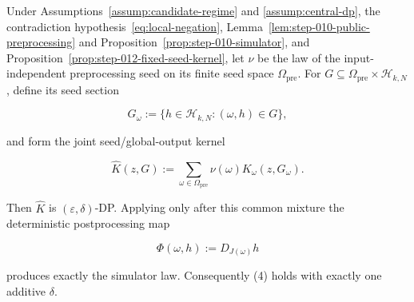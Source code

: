 \begin{lemma}\label{lem:step-012-postprocess-mixture}
Under Assumptions~\ref{assump:candidate-regime} and
\ref{assump:central-dp}, the contradiction hypothesis~\eqref{eq:local-negation}, Lemma~\ref{lem:step-010-public-preprocessing} and
Proposition~\ref{prop:step-010-simulator}, and
Proposition~\ref{prop:step-012-fixed-seed-kernel}, let \(\nu\) be the law
of the input-independent preprocessing seed on its finite seed space
\(\mathsf\Omega_{\mathrm{pre}}\).  For
\(G\subseteq\mathsf\Omega_{\mathrm{pre}}\times\mathcal H_{k,N}\), define
its seed section

\[
  G_\omega:=\{h\in\mathcal H_{k,N}:(\omega,h)\in G\},
\tag{20}
\]

and form the joint seed/global-output kernel

\[
  \widehat K(z,G)
  :=\sum_{\omega\in\mathsf\Omega_{\mathrm{pre}}}
       \nu(\omega)K_\omega(z,G_\omega).
\tag{21}
\]

Then \(\widehat K\) is \((\varepsilon,\delta)\)-DP.  Applying only after
this common mixture the deterministic postprocessing map

\[
  \Phi(\omega,h):=D_{J(\omega)}h
\tag{22}
\]

produces exactly the simulator law.  Consequently (4) holds with
exactly one additive \(\delta\).
\end{lemma}

